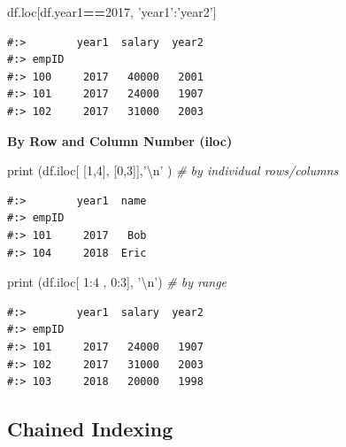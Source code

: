 \documentclass[
]{book}
\newenvironment{Shaded}{\begin{snugshade}}{\end{snugshade}}
\newcommand{\BuiltInTok}[1]{#1}
\newcommand{\CharTok}[1]{\textcolor[rgb]{0.5,0.5,0.5}{#1}}
\newcommand{\CommentTok}[1]{\textcolor[rgb]{0.37,0.37,0.37}{\textit{#1}}}
\newcommand{\DecValTok}[1]{\textcolor[rgb]{0.06,0.06,0.06}{#1}}
\newcommand{\NormalTok}[1]{#1}
\newcommand{\OperatorTok}[1]{\textcolor[rgb]{0.43,0.43,0.43}{\textbf{#1}}}
\newcommand{\StringTok}[1]{\textcolor[rgb]{0.5,0.5,0.5}{#1}}
\begin{document}
\begin{Shaded}
\begin{Highlighting}[]
\NormalTok{df.loc[df.year1}\OperatorTok{==}\DecValTok{2017}\NormalTok{, }\StringTok{'year1'}\NormalTok{:}\StringTok{'year2'}\NormalTok{]}
\end{Highlighting}
\end{Shaded}

\begin{verbatim}
#:>        year1  salary  year2
#:> empID                      
#:> 100     2017   40000   2001
#:> 101     2017   24000   1907
#:> 102     2017   31000   2003
\end{verbatim}

\textbf{By Row and Column Number (iloc)}

\begin{Shaded}
\begin{Highlighting}[]
\BuiltInTok{print}\NormalTok{ (df.iloc[ [}\DecValTok{1}\NormalTok{,}\DecValTok{4}\NormalTok{], [}\DecValTok{0}\NormalTok{,}\DecValTok{3}\NormalTok{]],}\StringTok{'}\CharTok{\textbackslash{}n}\StringTok{'}\NormalTok{ )   }\CommentTok{# by individual rows/columns}
\end{Highlighting}
\end{Shaded}

\begin{verbatim}
#:>        year1  name
#:> empID             
#:> 101     2017   Bob
#:> 104     2018  Eric
\end{verbatim}

\begin{Shaded}
\begin{Highlighting}[]
\BuiltInTok{print}\NormalTok{ (df.iloc[  }\DecValTok{1}\NormalTok{:}\DecValTok{4}\NormalTok{ ,  }\DecValTok{0}\NormalTok{:}\DecValTok{3}\NormalTok{], }\StringTok{'}\CharTok{\textbackslash{}n}\StringTok{'}\NormalTok{)    }\CommentTok{# by range}
\end{Highlighting}
\end{Shaded}

\begin{verbatim}
#:>        year1  salary  year2
#:> empID                      
#:> 101     2017   24000   1907
#:> 102     2017   31000   2003
#:> 103     2018   20000   1998
\end{verbatim}

\hypertarget{chained-indexing}{%
\subsection{Chained Indexing}\label{chained-indexing}}
\end{document}
